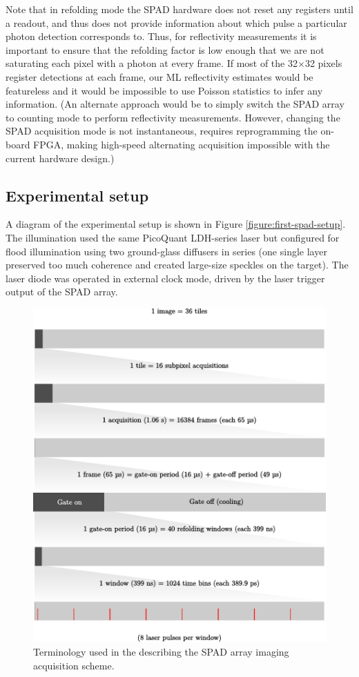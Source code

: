 Note that in refolding mode the SPAD hardware does not reset any registers until a readout, and thus does not provide information about which pulse a particular photon detection corresponds to. Thus, for reflectivity measurements it is important to ensure that the refolding factor is low enough that we are not saturating each pixel with a photon at every frame. If most of the 32$\times$32 pixels register detections at each frame, our ML reflectivity estimates would be featureless and it would be impossible to use Poisson statistics to infer any information. (An alternate approach would be to simply switch the SPAD array to counting mode to perform reflectivity measurements. However, changing the SPAD acquisition mode is not instantaneous, requires reprogramming the on-board FPGA, making high-speed alternating acquisition impossible with the current hardware design.)

\subsection{Experimental setup}
A diagram of the experimental setup is shown in Figure \ref{figure:first-spad-setup}. The illumination used the same PicoQuant LDH-series laser but configured for flood illumination using two ground-glass diffusers in series (one single layer preserved too much coherence and created large-size speckles on the target). The laser diode was operated in external clock mode, driven by the laser trigger output of the SPAD array.
 
\begin{figure}[h!]
\centerline{\includegraphics[width=15cm]{figure-first-spad-terms.pdf}}
\caption{Terminology used in the describing the SPAD array imaging acquisition scheme.}
\label{figure:first-spad-terms}
\end{figure}

